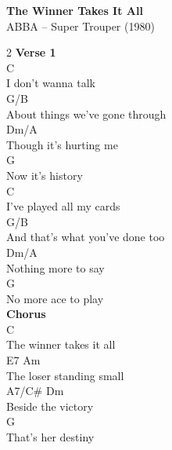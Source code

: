 \documentclass[a4paper]{article}
\begin{document}
    \setmainfont[BoldFont={TwCen-Bold.ttf}, ItalicFont={TwCen-Regular.ttf}, BoldItalicFont={TwCen-Regular.ttf}]{TwCen-Regular.ttf}
    \newcommand{\invisiblesection}[1]{\refstepcounter{section}\addcontentsline{toc}{section}{#1}\markboth{#1}{#1}}

    \begin{center}
        \textbf{The Winner Takes It All}
        ~\\
        ABBA -- Super Trouper (1980)
    \end{center}
    {
        \footnotesize

        \begin{multicols}
{2}            \textbf{Verse 1}
            ~\\
            {
                \cutive
                \obeyspaces
              C
\\
I don't wanna talk
\\
                   G/B
\\
About things we've gone through
\\
                    Dm/A
\\
Though it's hurting me
\\
              G
\\
Now it's history
\\
               C
\\
I've played all my cards
\\
                       G/B
\\
And that's what you've done too
\\
                Dm/A
\\
Nothing more to say
\\
               G
\\
No more ace to play
\\

            }
            \textbf{Chorus}
            ~\\
            {
                \cutive
                \obeyspaces
                    C
\\
The winner takes it all
\\
    E7             Am
\\
The loser standing small
\\
  A7/C\#         Dm
\\
Beside the victory
\\
                G
\\
That's her destiny
\\

}
\end{multicols}}
\end{document}
